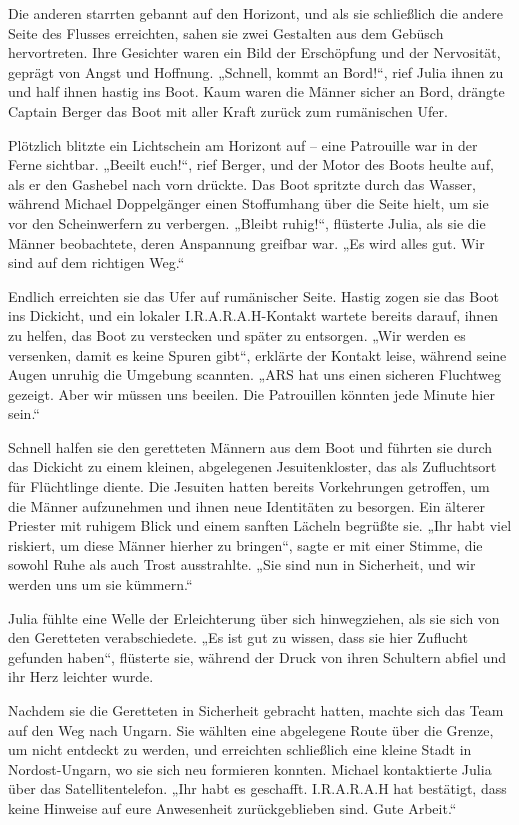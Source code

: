 \documentclass[
]{article}
\begin{document}
Die anderen starrten gebannt auf den Horizont, und als sie schließlich
die andere Seite des Flusses erreichten, sahen sie zwei Gestalten aus
dem Gebüsch hervortreten. Ihre Gesichter waren ein Bild der Erschöpfung
und der Nervosität, geprägt von Angst und Hoffnung. „Schnell, kommt an
Bord!{\kern0pt}``, rief Julia ihnen zu und half ihnen hastig ins Boot.
Kaum waren die Männer sicher an Bord, drängte Captain Berger das Boot
mit aller Kraft zurück zum rumänischen Ufer.

Plötzlich blitzte ein Lichtschein am Horizont auf -- eine Patrouille war
in der Ferne sichtbar. „Beeilt euch!{\kern0pt}``, rief Berger, und der
Motor des Boots heulte auf, als er den Gashebel nach vorn drückte. Das
Boot spritzte durch das Wasser, während Michael Doppelgänger einen
Stoffumhang über die Seite hielt, um sie vor den Scheinwerfern zu
verbergen. „Bleibt ruhig!{\kern0pt}``, flüsterte Julia, als sie die
Männer beobachtete, deren Anspannung greifbar war. „Es wird alles gut.
Wir sind auf dem richtigen Weg.``

Endlich erreichten sie das Ufer auf rumänischer Seite. Hastig zogen sie
das Boot ins Dickicht, und ein lokaler I.R.A.R.A.H-Kontakt wartete
bereits darauf, ihnen zu helfen, das Boot zu verstecken und später zu
entsorgen. „Wir werden es versenken, damit es keine Spuren gibt``,
erklärte der Kontakt leise, während seine Augen unruhig die Umgebung
scannten. „ARS hat uns einen sicheren Fluchtweg gezeigt. Aber wir müssen
uns beeilen. Die Patrouillen könnten jede Minute hier sein.``

Schnell halfen sie den geretteten Männern aus dem Boot und führten sie
durch das Dickicht zu einem kleinen, abgelegenen Jesuitenkloster, das
als Zufluchtsort für Flüchtlinge diente. Die Jesuiten hatten bereits
Vorkehrungen getroffen, um die Männer aufzunehmen und ihnen neue
Identitäten zu besorgen. Ein älterer Priester mit ruhigem Blick und
einem sanften Lächeln begrüßte sie. „Ihr habt viel riskiert, um diese
Männer hierher zu bringen``, sagte er mit einer Stimme, die sowohl Ruhe
als auch Trost ausstrahlte. „Sie sind nun in Sicherheit, und wir werden
uns um sie kümmern.``

Julia fühlte eine Welle der Erleichterung über sich hinwegziehen, als
sie sich von den Geretteten verabschiedete. „Es ist gut zu wissen, dass
sie hier Zuflucht gefunden haben``, flüsterte sie, während der Druck von
ihren Schultern abfiel und ihr Herz leichter wurde.

Nachdem sie die Geretteten in Sicherheit gebracht hatten, machte sich
das Team auf den Weg nach Ungarn. Sie wählten eine abgelegene Route über
die Grenze, um nicht entdeckt zu werden, und erreichten schließlich eine
kleine Stadt in Nordost-Ungarn, wo sie sich neu formieren konnten.
Michael kontaktierte Julia über das Satellitentelefon. „Ihr habt es
geschafft. I.R.A.R.A.H hat bestätigt, dass keine Hinweise auf eure
Anwesenheit zurückgeblieben sind. Gute Arbeit.``
\end{document}

